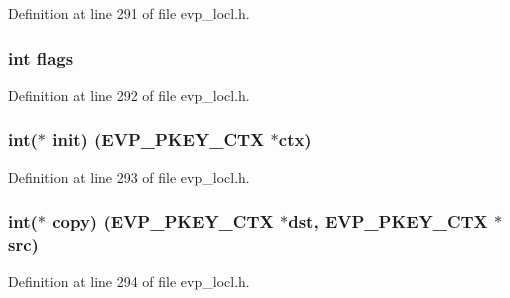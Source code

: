 Definition at line 291 of file evp\+\_\+locl.\+h.

\subsubsection[{\texorpdfstring{flags}{flags}}]{\setlength{\rightskip}{0pt plus 5cm}int flags}\hypertarget{structevp__pkey__method__st_ac8bf36fe0577cba66bccda3a6f7e80a4}{}\label{structevp__pkey__method__st_ac8bf36fe0577cba66bccda3a6f7e80a4}


Definition at line 292 of file evp\+\_\+locl.\+h.

\subsubsection[{\texorpdfstring{init}{init}}]{\setlength{\rightskip}{0pt plus 5cm}int($\ast$ init) ({\bf E\+V\+P\+\_\+\+P\+K\+E\+Y\+\_\+\+C\+TX} $\ast$ctx)}\hypertarget{structevp__pkey__method__st_aa94500437e8367c69b7563f54d62af08}{}\label{structevp__pkey__method__st_aa94500437e8367c69b7563f54d62af08}


Definition at line 293 of file evp\+\_\+locl.\+h.

\subsubsection[{\texorpdfstring{copy}{copy}}]{\setlength{\rightskip}{0pt plus 5cm}int($\ast$ copy) ({\bf E\+V\+P\+\_\+\+P\+K\+E\+Y\+\_\+\+C\+TX} $\ast$dst, {\bf E\+V\+P\+\_\+\+P\+K\+E\+Y\+\_\+\+C\+TX} $\ast$src)}\hypertarget{structevp__pkey__method__st_a48ccef4700fcee6a65e8fa43cd8efe5e}{}\label{structevp__pkey__method__st_a48ccef4700fcee6a65e8fa43cd8efe5e}


Definition at line 294 of file evp\+\_\+locl.\+h.

